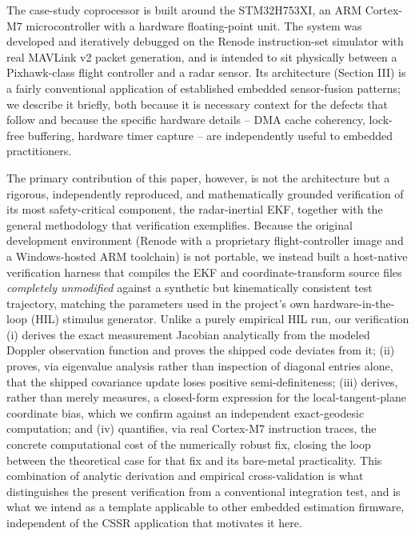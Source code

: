 \documentclass[conference]{IEEEtran}
\begin{document}
The case-study coprocessor is built around the STM32H753XI, an ARM Cortex-M7 microcontroller with a hardware floating-point unit. The system was developed and iteratively debugged on the Renode instruction-set simulator with real MAVLink v2 packet generation, and is intended to sit physically between a Pixhawk-class flight controller and a radar sensor. Its architecture (Section III) is a fairly conventional application of established embedded sensor-fusion patterns; we describe it briefly, both because it is necessary context for the defects that follow and because the specific hardware details -- DMA cache coherency, lock-free buffering, hardware timer capture -- are independently useful to embedded practitioners.

The primary contribution of this paper, however, is not the architecture but a rigorous, independently reproduced, and mathematically grounded verification of its most safety-critical component, the radar-inertial EKF, together with the general methodology that verification exemplifies. Because the original development environment (Renode with a proprietary flight-controller image and a Windows-hosted ARM toolchain) is not portable, we instead built a host-native verification harness that compiles the EKF and coordinate-transform source files \emph{completely unmodified} against a synthetic but kinematically consistent test trajectory, matching the parameters used in the project's own hardware-in-the-loop (HIL) stimulus generator. Unlike a purely empirical HIL run, our verification (i) derives the exact measurement Jacobian analytically from the modeled Doppler observation function and proves the shipped code deviates from it; (ii) proves, via eigenvalue analysis rather than inspection of diagonal entries alone, that the shipped covariance update loses positive semi-definiteness; (iii) derives, rather than merely measures, a closed-form expression for the local-tangent-plane coordinate bias, which we confirm against an independent exact-geodesic computation; and (iv) quantifies, via real Cortex-M7 instruction traces, the concrete computational cost of the numerically robust fix, closing the loop between the theoretical case for that fix and its bare-metal practicality. This combination of analytic derivation and empirical cross-validation is what distinguishes the present verification from a conventional integration test, and is what we intend as a template applicable to other embedded estimation firmware, independent of the CSSR application that motivates it here.
\end{document}
